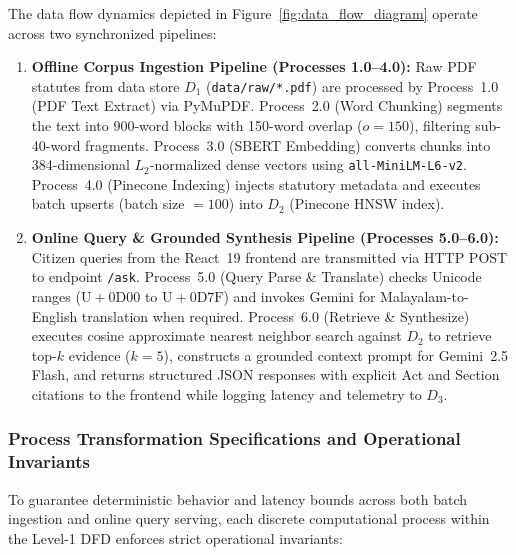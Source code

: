\documentclass[12pt,a4paper]{report}
\begin{document}
The data flow dynamics depicted in Figure~\ref{fig:data_flow_diagram} operate across two synchronized pipelines:
\begin{enumerate}\setlength{\itemsep}{1pt}\setlength{\parskip}{0pt}\setlength{\parsep}{0pt}
    \item \textbf{Offline Corpus Ingestion Pipeline (Processes 1.0--4.0):} Raw PDF statutes from data store $D_1$ (\texttt{data/raw/*.pdf}) are processed by Process~1.0 (PDF Text Extract) via PyMuPDF. Process~2.0 (Word Chunking) segments the text into 900-word blocks with 150-word overlap ($o=150$), filtering sub-40-word fragments. Process~3.0 (SBERT Embedding) converts chunks into 384-dimensional $L_2$-normalized dense vectors using \texttt{all-MiniLM-L6-v2}. Process~4.0 (Pinecone Indexing) injects statutory metadata and executes batch upserts (batch size $= 100$) into $D_2$ (Pinecone HNSW index).
    \item \textbf{Online Query \& Grounded Synthesis Pipeline (Processes 5.0--6.0):} Citizen queries from the React~19 frontend are transmitted via HTTP POST to endpoint \texttt{/ask}. Process~5.0 (Query Parse \& Translate) checks Unicode ranges ($\mathrm{U{+}0D00}$ to $\mathrm{U{+}0D7F}$) and invokes Gemini for Malayalam-to-English translation when required. Process~6.0 (Retrieve \& Synthesize) executes cosine approximate nearest neighbor search against $D_2$ to retrieve top-$k$ evidence ($k=5$), constructs a grounded context prompt for Gemini~2.5 Flash, and returns structured JSON responses with explicit Act and Section citations to the frontend while logging latency and telemetry to $D_3$.
\end{enumerate}

\subsubsection{Process Transformation Specifications and Operational Invariants}
To guarantee deterministic behavior and latency bounds across both batch ingestion and online query serving, each discrete computational process within the Level-1 DFD enforces strict operational invariants:
\end{document}
